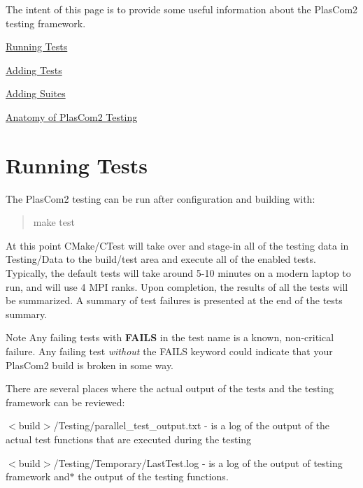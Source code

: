 The intent of this page is to provide some useful information about the Plas\+Com2 testing framework.


\begin{DoxyItemize}
\item \hyperlink{testing_reference_running}{Running Tests}
\item \hyperlink{testing_reference_addtest}{Adding Tests}
\item \hyperlink{testing_reference_addsuite}{Adding Suites}
\item \hyperlink{testing_reference_anatomy}{Anatomy of Plas\+Com2 Testing}
\end{DoxyItemize}\hypertarget{testing_reference_running}{}\section{Running Tests}\label{testing_reference_running}
The Plas\+Com2 testing can be run after configuration and building with\+:

\begin{quote}
make test \end{quote}


At this point C\+Make/\+C\+Test will take over and stage-\/in all of the testing data in Testing/\+Data to the build/test area and execute all of the enabled tests. Typically, the default tests will take around 5-\/10 minutes on a modern laptop to run, and will use 4 M\+PI ranks. Upon completion, the results of all the tests will be summarized. A summary of test failures is presented at the end of the tests summary.

\begin{DoxyNote}{Note}
Any failing tests with {\bfseries F\+A\+I\+LS} in the test name is a known, non-\/critical failure. Any failing test {\itshape without} the F\+A\+I\+LS keyword could indicate that your Plas\+Com2 build is broken in some way.
\end{DoxyNote}
There are several places where the actual output of the tests and the testing framework can be reviewed\+:


\begin{DoxyItemize}
\item $<$build$>$/\+Testing/parallel\+\_\+test\+\_\+output.txt -\/ is a log of the output of the actual test functions that are executed during the testing
\item $<$build$>$/\+Testing/\+Temporary/\+Last\+Test.log -\/ is a log of the output of testing framework and$\ast$ the output of the testing functions.
\end{DoxyItemize}

